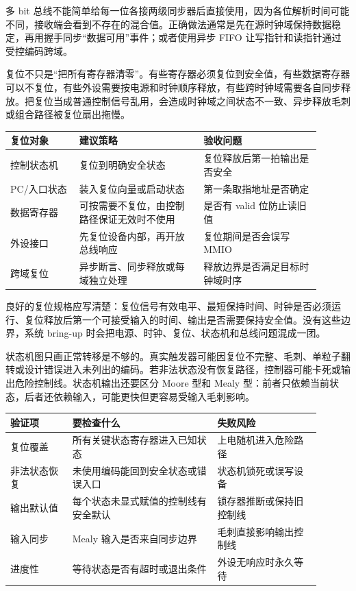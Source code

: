 多 bit 总线不能简单给每一位各接两级同步器后直接使用，因为各位解析时间可能不同，接收端会看到不存在的混合值。正确做法通常是先在源时钟域保持数据稳定，再用握手同步“数据可用”事件；或者使用异步 FIFO 让写指针和读指针通过受控编码跨域。

复位不只是“把所有寄存器清零”。有些寄存器必须复位到安全值，有些数据寄存器可以不复位，有些外设需要按电源和时钟顺序释放，有些跨时钟域需要各自同步释放。把复位当成普通控制信号乱用，会造成时钟域之间状态不一致、异步释放毛刺或组合路径被复位扇出拖慢。

\begin{longtable}{L{0.2\linewidth}L{0.36\linewidth}L{0.34\linewidth}}
\toprule
复位对象 & 建议策略 & 验收问题 \\
\midrule
控制状态机 & 复位到明确安全状态 & 复位释放后第一拍输出是否安全 \\
PC/入口状态 & 装入复位向量或启动状态 & 第一条取指地址是否确定 \\
数据寄存器 & 可按需要不复位，由控制路径保证无效时不使用 & 是否有 valid 位防止读旧值 \\
外设接口 & 先复位设备内部，再开放总线响应 & 复位期间是否会误写 MMIO \\
跨域复位 & 异步断言、同步释放或每域独立处理 & 释放边界是否满足目标时钟域时序 \\
\bottomrule
\end{longtable}

良好的复位规格应写清楚：复位信号有效电平、最短保持时间、时钟是否必须运行、复位释放后第一个可接受输入的时间、输出是否需要保持安全值。没有这些边界，系统 bring-up 时会把电源、时钟、复位、状态机和总线问题混成一团。

状态机图只画正常转移是不够的。真实触发器可能因复位不完整、毛刺、单粒子翻转或设计错误进入未列出的编码。若非法状态没有恢复路径，控制器可能卡死或输出危险控制线。状态机输出还要区分 Moore 型和 Mealy 型：前者只依赖当前状态，后者还依赖输入，可能更快但更容易受输入毛刺影响。

\begin{longtable}{L{0.18\linewidth}L{0.42\linewidth}L{0.3\linewidth}}
\toprule
验证项 & 要检查什么 & 失败风险 \\
\midrule
复位覆盖 & 所有关键状态寄存器进入已知状态 & 上电随机进入危险路径 \\
非法状态恢复 & 未使用编码能回到安全状态或错误入口 & 状态机锁死或误写设备 \\
输出默认值 & 每个状态未显式赋值的控制线有安全默认 & 锁存器推断或保持旧控制线 \\
输入同步 & Mealy 输入是否来自同步边界 & 毛刺直接影响输出控制线 \\
进度性 & 等待状态是否有超时或退出条件 & 外设无响应时永久等待 \\
\bottomrule
\end{longtable}

